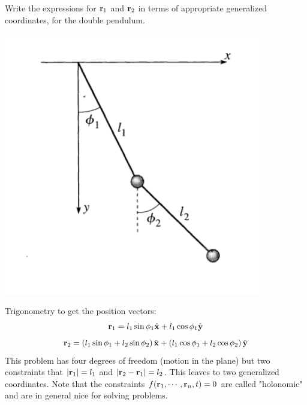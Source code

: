 \documentclass[../PHYS306Notes.tex]{subfiles}
\begin{document}
\begin{p}
Write the expressions for $\mathbf{r}_1$ and $\mathbf{r}_2$ in terms of appropriate generalized coordinates, for the double pendulum. 
\begin{center}
    \includegraphics[scale=0.6]{Lecture-3/W3-img2.png}
\end{center}
\end{p}
\begin{s}
Trigonometry to get the position vectors:
\[\mathbf{r}_1 = l_1\sin\phi_1\hat{\mathbf{x}} + l_1\cos\phi_1\hat{\mathbf{y}}\]
\[\mathbf{r}_2 = \left(l_1\sin\phi_1 + l_2\sin\phi_2\right)\hat{\mathbf{x}} + \left(l_1\cos\phi_1 + l_2\cos\phi_2\right)\hat{\mathbf{y}}\]
This problem has four degrees of freedom (motion in the plane) but two constraints that $\abs{\mathbf{r}_1} = l_1$ and $\abs{\mathbf{r}_2 - \mathbf{r}_1} = l_2$. This leaves to two generalized coordinates. Note that the constraints $f(\mathbf{r}_1, \cdots, \mathbf{r}_n, t) = 0$ are called "holonomic" and are in general nice for solving problems.
\end{s}
\end{document}
